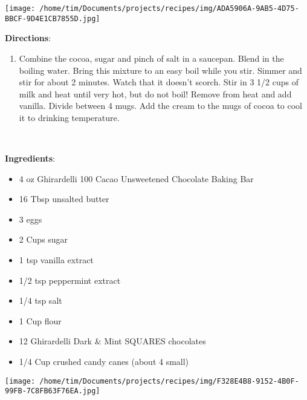 \documentclass[11pt, twoside, openany]{book}
\begin{document}
\begin{minipage}[t]{0.2\linewidth}
\centering \strut\vspace*{-\baselineskip}\newline
\texttt{[image: /home/tim/Documents/projects/recipes/img/ADA5906A-9AB5-4D75-BBCF-9D4E1CB7855D.jpg]}\\
\end{minipage}\vspace{3mm}
\textbf{Directions}:
\vspace{-3mm}\begin{enumerate}\setlength\itemsep{-1mm}
\item Combine the cocoa, sugar and pinch of salt in a saucepan. Blend in the boiling water. Bring this mixture to an easy boil while you stir. Simmer and stir for about 2 minutes. Watch that it doesn't scorch. Stir in 3 1/2 cups of milk and heat until very hot, but do not boil! Remove from heat and add vanilla. Divide between 4 mugs. Add the cream to the mugs of cocoa to cool it to drinking temperature.
\end{enumerate}
 \label{peppermint-brownies}\hfill\textit{}\\
\begin{minipage}[t]{0.8\linewidth}
\textbf{Ingredients}:\vspace{-3mm}
\begin{multicols}{2}
\begin{itemize}\setlength\itemsep{-1mm}
\item 4 oz Ghirardelli 100 Cacao Unsweetened Chocolate Baking Bar
\item 16 Tbsp unsalted butter
\item 3 eggs
\item 2 Cups sugar
\item 1 tsp vanilla extract
\item 1/2 tsp peppermint extract
\item 1/4 tsp salt
\item 1 Cup flour
\item 12 Ghirardelli Dark & Mint SQUARES chocolates
\item 1/4 Cup crushed candy canes (about 4 small)
\end{itemize}
\end{multicols}
\end{minipage}
\begin{minipage}[t]{0.2\linewidth}
\centering \strut\vspace*{-\baselineskip}\newline
\texttt{[image: /home/tim/Documents/projects/recipes/img/F328E4B8-9152-4B0F-99FB-7C8FB63F76EA.jpg]}\\
\end{minipage}\vspace{3mm}
\end{document}
